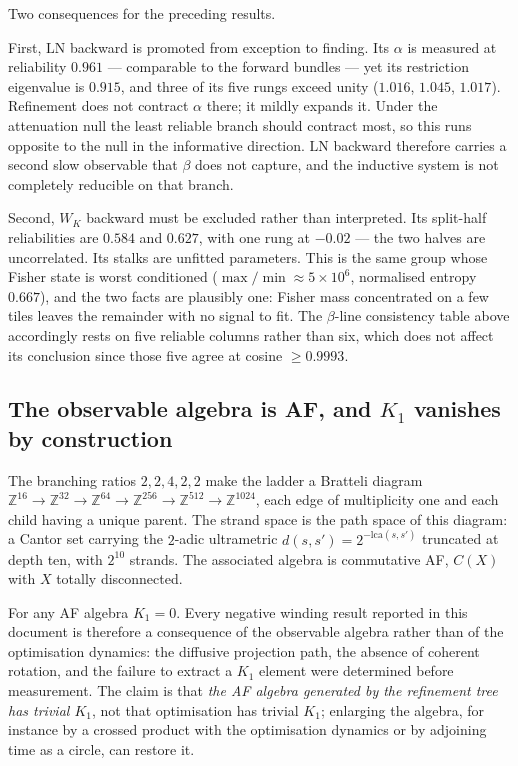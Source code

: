 Two consequences for the preceding results.

First, $\mathrm{LN}$ backward is promoted from exception to finding. Its
$\alpha$ is measured at reliability $0.961$ --- comparable to the forward
bundles --- yet its restriction eigenvalue is $0.915$, and three of its five
rungs exceed unity ($1.016$, $1.045$, $1.017$). Refinement does not contract
$\alpha$ there; it mildly expands it. Under the attenuation null the least
reliable branch should contract most, so this runs opposite to the null in the
informative direction. $\mathrm{LN}$ backward therefore carries a second slow
observable that $\beta$ does not capture, and the inductive system is not
completely reducible on that branch.

Second, $W_K$ backward must be excluded rather than interpreted. Its split-half
reliabilities are $0.584$ and $0.627$, with one rung at $-0.02$ --- the two
halves are uncorrelated. Its stalks are unfitted parameters. This is the same
group whose Fisher state is worst conditioned ($\max/\min \approx 5\times10^{6}$,
normalised entropy $0.667$), and the two facts are plausibly one: Fisher mass
concentrated on a few tiles leaves the remainder with no signal to fit. The
$\beta$-line consistency table above accordingly rests on five reliable columns
rather than six, which does not affect its conclusion since those five agree at
cosine $\geq 0.9993$.

\subsection{The observable algebra is AF, and \texorpdfstring{$K_1$}{K1} vanishes by construction}

The branching ratios $2,2,4,2,2$ make the ladder a Bratteli diagram
$\mathbb{Z}^{16}\to\mathbb{Z}^{32}\to\mathbb{Z}^{64}\to\mathbb{Z}^{256}
\to\mathbb{Z}^{512}\to\mathbb{Z}^{1024}$, each edge of multiplicity one and
each child having a unique parent. The strand space is the path space of this
diagram: a Cantor set carrying the $2$-adic ultrametric
$d(s,s') = 2^{-\mathrm{lca}(s,s')}$ truncated at depth ten, with $2^{10}$
strands. The associated algebra is commutative AF, $C(X)$ with $X$ totally
disconnected.

\begin{proposition}
For any AF algebra $K_1 = 0$. Every negative winding result reported in this
document is therefore a consequence of the observable algebra rather than of
the optimisation dynamics: the diffusive projection path, the absence of
coherent rotation, and the failure to extract a $K_1$ element were determined
before measurement. The claim is that \emph{the AF algebra generated by the
refinement tree has trivial $K_1$}, not that optimisation has trivial $K_1$;
enlarging the algebra, for instance by a crossed product with the optimisation
dynamics or by adjoining time as a circle, can restore it.
\end{proposition}

